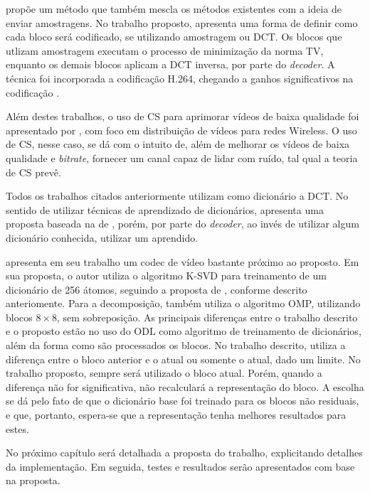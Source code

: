 \documentclass[cic,tc]{iiufrgs}
\begin{document}
\citet{ZhangVideoCS} propõe um método que também mescla os métodos existentes
com a ideia de enviar amostragens. 
No trabalho proposto, apresenta uma forma de definir como cada bloco será codificado,
se utilizando amostragem ou DCT.
Os blocos que utlizam amostragem executam o processo de minimização da norma TV, 
enquanto os demais blocos aplicam a DCT inversa, por parte do \textit{decoder}.
A técnica foi incorporada a codificação H.264, chegando a ganhos significativos na
codificação \cite{ZhangVideoCS}.

Além destes trabalhos, o uso de CS para aprimorar vídeos de baixa qualidade foi 
apresentado por \citet{WirelessXiangCai}, com foco em distribuição de vídeos para
redes Wireless.
O uso de CS, nesse caso, se dá com o intuito de, além de melhorar os vídeos de baixa
qualidade e \textit{bitrate}, fornecer um canal capaz de lidar com ruído, 
tal qual a teoria de CS prevê.

Todos os trabalhos citados anteriormente utilizam como dicionário a DCT.
No sentido de utilizar técnicas de aprendizado de dicionários, 
\citet{chen2010dictionary} apresenta uma proposta baseada na de \citet{ZhangVideoCS},
porém, por parte do \textit{decoder}, ao invés de utilizar algum dicionário conhecida,
utilizar um aprendido.

\citet{lima2012codificaccao} apresenta em seu trabalho um codec de vídeo bastante 
próximo ao proposto.
Em sua proposta, o autor utiliza o algoritmo K-SVD para treinamento de um dicionário
de 256 átomos, seguindo a proposta de \citeauthor{BRYTFACEKSVD}, conforme descrito
anteriomente.
Para a decomposição, também utiliza o algoritmo OMP, utilizando blocos $8\times8$,
sem sobreposição.
As principais diferenças entre o trabalho descrito e o proposto
estão no uso do ODL como algoritmo de treinamento de dicionários, 
além da forma como são processados os blocos.
No trabalho descrito, \citeauthor{lima2012codificaccao} utiliza a diferença entre o
bloco anterior e o atual ou somente o atual, dado um limite. 
No trabalho proposto, sempre será utilizado o bloco atual.
Porém, quando a diferença não for significativa, não recalculará a representação do bloco.
A escolha se dá pelo fato de que o dicionário base foi treinado para os blocos 
não residuais, e que, portanto, espera-se que a representação tenha melhores resultados 
para estes.

No próximo capítulo será detalhada a proposta do trabalho, explicitando detalhes
da implementação.
Em seguida, testes e resultados serão apresentados com base na proposta.
\end{document}
